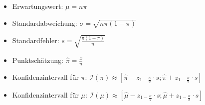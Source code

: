 \begin{itemize}
    \item Erwartungswert: \(\mu=n\pi\)
    \item Standardabweichung: \(\sigma=\sqrt{n\pi(1-\pi)}\)
    \item Standardfehler: \(s=\sqrt{\frac{\pi(1-\pi)}{n}}\)
    \item Punktschätzung: \(\hat{\pi}=\frac{x}{n}\)
    \item Konfidenzintervall für \(\pi\): \(\mathcal{I}(\pi)\approx \left[\hat{\pi}-z_{1-\frac{\alpha}{2}}\cdot s; \hat{\pi}+z_{1-\frac{\alpha}{2}}\cdot s\right]\)
    \item Konfidenzintervall für \(\mu\): \(\mathcal{I}(\mu)\approx \left[\hat{\mu}-z_{1-\frac{\alpha}{2}}\cdot s; \hat{\mu}+z_{1-\frac{\alpha}{2}}\cdot s\right]\)
\end{itemize}